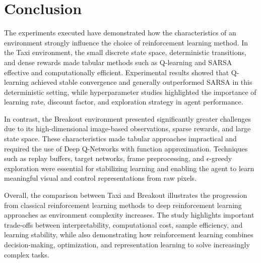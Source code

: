\documentclass[11pt]{article}
\begin{document}
\section*{Conclusion}

The experiments executed have demonstrated how the characteristics of an environment strongly influence the choice of reinforcement learning method. In the Taxi environment, the small discrete state space, deterministic transitions, and dense rewards made tabular methods such as Q-learning and SARSA effective and computationally efficient. Experimental results showed that Q-learning achieved stable convergence and generally outperformed SARSA in this deterministic setting, while hyperparameter studies highlighted the importance of learning rate, discount factor, and exploration strategy in agent performance.

In contrast, the Breakout environment presented significantly greater challenges due to its high-dimensional image-based observations, sparse rewards, and large state space. These characteristics made tabular approaches impractical and required the use of Deep Q-Networks with function approximation. Techniques such as replay buffers, target networks, frame preprocessing, and $\epsilon$-greedy exploration were essential for stabilizing learning and enabling the agent to learn meaningful visual and control representations from raw pixels.

Overall, the comparison between Taxi and Breakout illustrates the progression from classical reinforcement learning methods to deep reinforcement learning approaches as environment complexity increases. The study highlights important trade-offs between interpretability, computational cost, sample efficiency, and learning stability, while also demonstrating how reinforcement learning combines decision-making, optimization, and representation learning to solve increasingly complex tasks.


\end{document}
